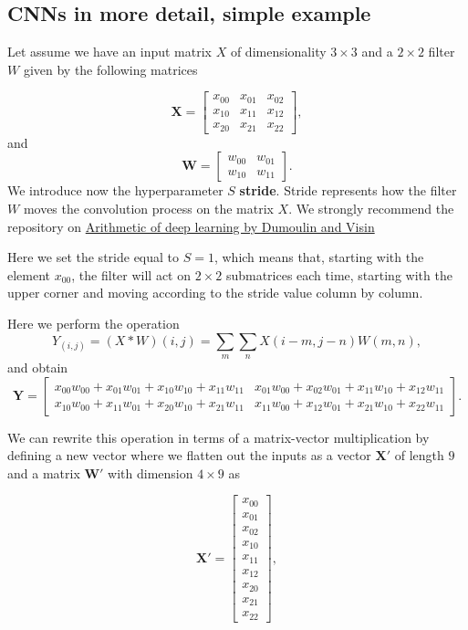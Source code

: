\documentclass[%
oneside,                 %
final,                   %
10pt]{article}
\begin{document}
\subsection{CNNs in more detail, simple example}

Let assume we have an input matrix $X$ of dimensionality $3\times 3$
and a $2\times 2$ filter $W$ given by the following matrices

\[
\bm{X}=\begin{bmatrix}x_{00} & x_{01} & x_{02}  \\
                      x_{10} & x_{11} & x_{12}  \\
	              x_{20} & x_{21} & x_{22} \end{bmatrix},
\]
and 
\[
\bm{W}=\begin{bmatrix}w_{00} & w_{01} \\
	              w_{10} & w_{11}\end{bmatrix}.
\]
We introduce now the hyperparameter $S$ \textbf{stride}. Stride represents how the filter $W$ moves the convolution process on the matrix $X$.
We strongly recommend the repository on \href{{https://github.com/vdumoulin/conv_arithmetic}}{Arithmetic of deep learning by Dumoulin and Visin} 

Here we set the stride equal to $S=1$, which means that, starting with the element $x_{00}$, the filter will act on $2\times 2$ submatrices each time, starting with the upper corner and moving according to the stride value column by column. 

Here we perform the operation
\[
Y_(i,j)=(X * W)(i,j) = \sum_m\sum_n X(i-m,j-n)W(m,n),
\]
and obtain
\[
\bm{Y}=\begin{bmatrix}x_{00}w_{00}+x_{01}w_{01}+x_{10}w_{10}+x_{11}w_{11} & x_{01}w_{00}+x_{02}w_{01}+x_{11}w_{10}+x_{12}w_{11}  \\
	              x_{10}w_{00}+x_{11}w_{01}+x_{20}w_{10}+x_{21}w_{11} & x_{11}w_{00}+x_{12}w_{01}+x_{21}w_{10}+x_{22}w_{11}\end{bmatrix}.
\]

We can rewrite this operation in terms of a matrix-vector multiplication by defining a new vector where we flatten out the inputs as a vector $\bm{X}'$ of length $9$ and
a matrix $\bm{W}'$ with dimension $4\times 9$ as

\[
\bm{X}'=\begin{bmatrix}x_{00} \\ x_{01} \\ x_{02} \\ x_{10} \\ x_{11} \\ x_{12} \\ x_{20} \\ x_{21} \\ x_{22} \end{bmatrix},
\]
\end{document}
